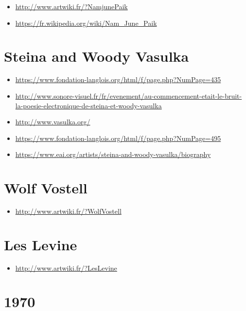 \documentclass[
]{book}
\providecommand{\tightlist}{%
  \setlength{\itemsep}{0pt}\setlength{\parskip}{0pt}}
\begin{document}
\begin{itemize}
\tightlist
\item
  \url{http://www.artwiki.fr/?NamjunePaik}
\item
  \url{https://fr.wikipedia.org/wiki/Nam_June_Paik}
\end{itemize}

\hypertarget{steina-and-woody-vasulka}{%
\section{Steina and Woody Vasulka}\label{steina-and-woody-vasulka}}

\begin{itemize}
\tightlist
\item
  \url{https://www.fondation-langlois.org/html/f/page.php?NumPage=435}
\item
  \url{http://www.sonore-visuel.fr/fr/evenement/au-commencement-etait-le-bruit-la-poesie-electronique-de-steina-et-woody-vasulka}
\item
  \url{http://www.vasulka.org/}
\item
  \url{https://www.fondation-langlois.org/html/f/page.php?NumPage=495}
\item
  \url{https://www.eai.org/artists/steina-and-woody-vasulka/biography}
\end{itemize}

\hypertarget{wolf-vostell}{%
\section{Wolf Vostell}\label{wolf-vostell}}

\begin{itemize}
\tightlist
\item
  \url{http://www.artwiki.fr/?WolfVostell}
\end{itemize}

\hypertarget{les-levine}{%
\section{Les Levine}\label{les-levine}}

\begin{itemize}
\tightlist
\item
  \url{http://www.artwiki.fr/?LesLevine}
\end{itemize}

\hypertarget{section}{%
\section{1970}\label{section}}
\end{document}
